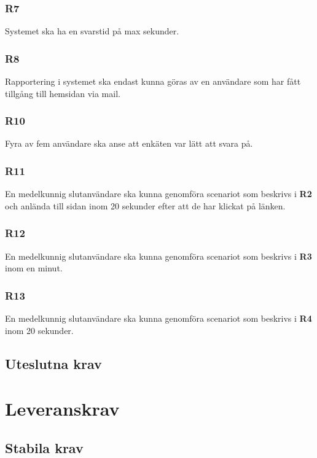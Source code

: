 \documentclass{article}
\begin{document}
     \subsubsection*{R7}
    Systemet ska ha en svarstid på max \underline{\hspace{1cm}} sekunder.
    
    \subsubsection*{R8}
    Rapportering i systemet ska endast kunna göras av en användare som har fått tillgång till hemsidan via mail.
    
     
    \subsubsection*{R10}
    Fyra av fem användare ska anse att enkäten var lätt att svara på.
    
    \subsubsection*{R11}
    En medelkunnig slutanvändare ska kunna genomföra scenariot som beskrivs i \textbf{R2} och anlända till sidan inom 20 sekunder efter att de har klickat på länken.
    
    \subsubsection*{R12}
    En medelkunnig slutanvändare ska kunna genomföra scenariot som beskrivs i \textbf{R3} inom en minut.
    
    \subsubsection*{R13}
    En medelkunnig slutanvändare ska kunna genomföra scenariot som beskrivs i \textbf{R4} inom 20 sekunder.
    
    \subsection*{Uteslutna krav}
    
    \section{Leveranskrav}
    
    \subsection*{Stabila krav}
\end{document}
